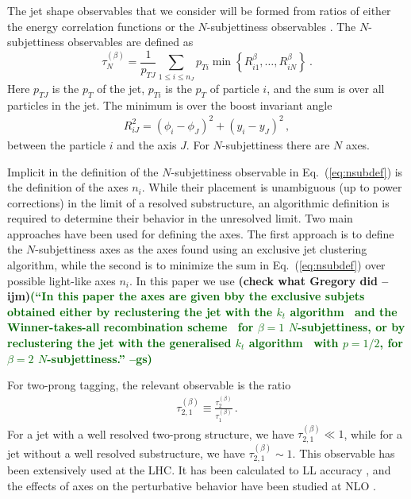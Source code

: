\documentclass[11pt,letterpaper]{article}
\DeclareRobustCommand{\Eq}[1]{Eq.~(\ref{#1})}
\newcommand{\Nsub}[2]{\tau_{#1}^{(#2)}}
\newcommand{\ijm}[1]{\textbf{\textcolor{llblue}{(#1 --ijm)}}}
\newcommand{\gs}[1]{\textbf{\textcolor{darkgreen}{(#1 --gs)}}}
\begin{document}
The jet shape observables that we consider will be formed from ratios of either the energy correlation functions \cite{Larkoski:2013eya,Moult:2016cvt} or the $N$-subjettiness observables \cite{Thaler:2010tr,Thaler:2011gf}.  The $N$-subjettiness observables are defined as \cite{Stewart:2010tn,Thaler:2010tr,Thaler:2011gf}
\begin{equation}\label{eq:nsubdef}
\Nsub{N}{\beta} = \frac{1}{p_{TJ}}\sum_{1\leq i \leq n_J} p_{Ti}\min\left\{
R_{i1}^\beta,\dotsc,R_{iN}^\beta
\right\} \ .
\end{equation}
Here $p_{TJ}$ is the $p_T$ of the jet,  $p_{Ti}$ is the $p_T$ of particle $i$, and the sum is over all particles in the jet. The minimum is over the boost invariant angle
\begin{align}\label{eq:ptratio}  
R_{iJ}^2 = (\phi_i-\phi_J)^2+(y_i-y_J)^2\,,
\end{align}
between the particle $i$ and the axis $J$. For $N$-subjettiness there are $N$ axes.

Implicit in the definition of the $N$-subjettiness observable in
\Eq{eq:nsubdef} is the definition of the axes $n_i$. While their
placement is unambiguous (up to power corrections) in the limit of a
resolved substructure, an algorithmic definition is required to
determine their behavior in the unresolved limit.  Two main approaches
have been used for defining the axes. The first approach is to define
the $N$-subjettiness axes as the axes found using an exclusive jet
clustering algorithm, while the second is to minimize the sum in
\Eq{eq:nsubdef} over possible light-like axes $n_i$. In this paper we
use \ijm{check what Gregory did}\gs{``In this paper the axes are given
  bby the exclusive subjets obtained either by reclustering the jet
  with the $k_t$ algorithm~\cite{Catani:1993hr} and the
  Winner-takes-all recombination scheme~\cite{Larkoski:2014uqa} for
  $\beta=1$ $N$-subjettiness, or by reclustering the jet with the
  generalised $k_t$ algorithm~\cite{Cacciari:2011ma} with $p=1/2$, for
  $\beta=2$ $N$-subjettiness.''}




For two-prong tagging, the relevant observable is the ratio \cite{Thaler:2010tr}
\begin{align}
\Nsub{2,1}{\beta}\equiv \frac{\Nsub{2}{\beta}}{\Nsub{1}{\beta}}\,.
\end{align}
For a jet with a well resolved two-prong structure, we have $\Nsub{2,1}{\beta}\ll 1$, while for a jet without a well resolved substructure, we have $\Nsub{2,1}{\beta}\sim 1$.
This observable has been extensively used at the LHC. It has been calculated to LL accuracy \cite{Dasgupta:2015lxh}, and the effects of axes on the perturbative behavior have been studied at NLO \cite{Larkoski:2015uaa}.
\end{document}
